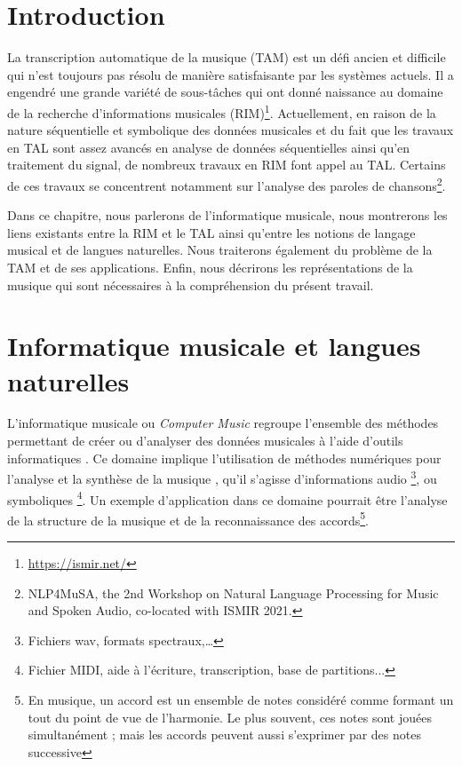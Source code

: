 \section*{Introduction}
La transcription automatique de la musique (TAM) est un défi ancien
\cite{first_one} et difficile qui n’est toujours pas résolu de manière
satisfaisante par les systèmes actuels. Il a engendré une
grande variété de sous-tâches qui ont donné naissance au domaine de la
recherche d’informations musicales (RIM)\footnote{\url{https://ismir.net/}}.
Actuellement, en raison de la nature séquentielle et symbolique des données
musicales et du fait que les travaux en TAL sont assez avancés en analyse de
données séquentielles ainsi qu’en traitement du signal, de nombreux travaux en
RIM font appel au TAL. Certains de ces travaux se concentrent notamment sur
l’analyse des paroles de chansons\footnote{NLP4MuSA, the 2nd Workshop on
Natural Language Processing for Music and Spoken Audio, co-located with ISMIR
2021.}.

Dans ce chapitre, nous parlerons de l’informatique musicale, nous montrerons
les liens existants entre la RIM et le TAL ainsi qu’entre les notions de
langage musical et de langues naturelles. Nous traiterons également du problème
de la TAM et de ses applications. Enfin, nous décrirons les représentations de
la musique qui sont nécessaires à la compréhension du présent travail.

\section{Informatique musicale et langues naturelles}
L’informatique musicale ou \textit{Computer Music} regroupe l’ensemble des
méthodes permettant de créer ou d’analyser des données musicales à l’aide
d’outils informatiques \cite{book_muller}. Ce domaine implique l’utilisation de
méthodes numériques pour l’analyse et la synthèse de la musique \cite{fourier},
qu’il s’agisse d’informations audio \footnote{Fichiers wav, formats
spectraux,…}, ou symboliques \footnote{Fichier MIDI, aide à l’écriture,
transcription, base de partitions...}. Un exemple d’application dans ce domaine
pourrait être l’analyse de la structure de la musique et de la reconnaissance
des accords\footnote{En musique, un accord est un ensemble de notes considéré
comme formant un tout du point de vue de l’harmonie. Le plus souvent, ces notes
sont jouées simultanément ; mais les accords peuvent aussi s’exprimer par des
notes successive}.


